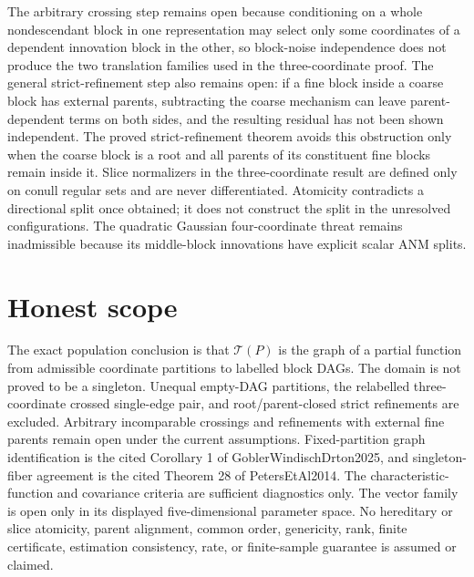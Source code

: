 \documentclass{article}
\begin{document}
The arbitrary crossing step remains open because conditioning on a whole nondescendant block in one representation may select only some coordinates of a dependent innovation block in the other, so block-noise independence does not produce the two translation families used in the three-coordinate proof. The general strict-refinement step also remains open: if a fine block inside a coarse block has external parents, subtracting the coarse mechanism can leave parent-dependent terms on both sides, and the resulting residual has not been shown independent. The proved strict-refinement theorem avoids this obstruction only when the coarse block is a root and all parents of its constituent fine blocks remain inside it. Slice normalizers in the three-coordinate result are defined only on conull regular sets and are never differentiated. Atomicity contradicts a directional split once obtained; it does not construct the split in the unresolved configurations. The quadratic Gaussian four-coordinate threat remains inadmissible because its middle-block innovations have explicit scalar ANM splits.

\section{Honest scope}

The exact population conclusion is that \(\mathcal T(P)\) is the graph of a partial function from admissible coordinate partitions to labelled block DAGs. The domain is not proved to be a singleton. Unequal empty-DAG partitions, the relabelled three-coordinate crossed single-edge pair, and root/parent-closed strict refinements are excluded. Arbitrary incomparable crossings and refinements with external fine parents remain open under the current assumptions. Fixed-partition graph identification is the cited Corollary 1 of GoblerWindischDrton2025, and singleton-fiber agreement is the cited Theorem 28 of PetersEtAl2014. The characteristic-function and covariance criteria are sufficient diagnostics only. The vector family is open only in its displayed five-dimensional parameter space. No hereditary or slice atomicity, parent alignment, common order, genericity, rank, finite certificate, estimation consistency, rate, or finite-sample guarantee is assumed or claimed.
\end{document}
